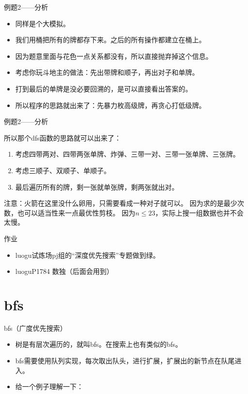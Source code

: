 \documentclass{bemaer}[UTF-8]
\begin{document}
\begin{frame}{例题2——分析}
\begin{itemize}
\item 同样是个大模拟。
\item 我们用桶把所有的牌都存下来。之后的所有操作都建立在桶上。
\item 因为题意里面与花色一点关系都没有，所以直接抛弃掉这个信息。
\item 考虑你玩斗地主的做法：先出带牌和顺子，再出对子和单牌。
\item 打到最后的单牌是没必要回溯的，是可以直接看出答案的。
\item 所以程序的思路就出来了：先暴力枚高级牌，再贪心打低级牌。
\end{itemize}
\end{frame}

\begin{frame}{例题2——分析}
\begin{itemize}
所以那个dfs函数的思路就可以出来了：
\begin{enumerate}
  \item 考虑四带两对、四带两张单牌、炸弹、三带一对、三带一张单牌、三张牌。
  \item 考虑三顺子、双顺子、单顺子。
  \item 最后遍历所有的牌，剩一张就单张牌，剩两张就出对。
\end{enumerate}
注意：火箭在这里没什么卵用，只需要看成一种对子就可以。
因为求的是最少次数，也可以适当性来一点最优性剪枝。
因为$n \leq 23$，实际上搜一组数据也并不会太慢。
\end{itemize}
\end{frame}

\begin{frame}{作业}
\begin{itemize}
  \item luogu试炼场pj组的“深度优先搜索”专题做到绿。
  \item luoguP1784 数独（后面会用到）
\end{itemize}
\end{frame}

\section{bfs}

\begin{frame}{bfs（广度优先搜索）}
\begin{itemize}
  \item 树是有层次遍历的，就叫bfs。在搜索上也有类似的bfs。
  \item bfs需要使用队列实现，每次取出队头，进行扩展，扩展出的新节点在队尾进入。
  \item 给一个例子理解一下：
\end{itemize}
\end{frame}
\end{document}
